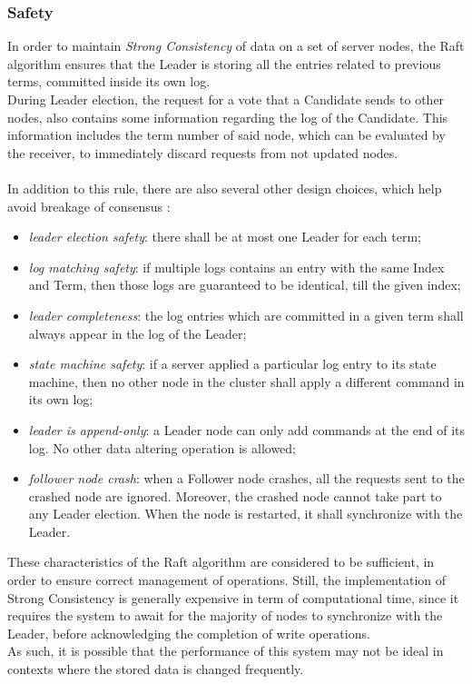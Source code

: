 \subsubsection{Safety}
In order to maintain \textit{Strong Consistency} of data on a set of server nodes, the Raft algorithm ensures that the Leader is storing all the entries related to previous terms, committed inside its own log. \\
During Leader election, the request for a vote that a Candidate sends to other nodes, also contains some information regarding the log of the Candidate. This information includes the term number of said node, which can be evaluated by the receiver, to immediately discard requests from not updated nodes. \\ \\
In addition to this rule, there are also several other design choices, which help avoid breakage of consensus \cite{site:raft-consensus-algorithm}:
\begin{itemize}
	\item \textit{leader election safety}: there shall be at most one Leader for each term;
	\item \textit{log matching safety}: if multiple logs contains an entry with the same Index and Term, then those logs are guaranteed to be identical, till the given index;
	\item \textit{leader completeness}: the log entries which are committed in a given term shall always appear in the log of the Leader;
	\item \textit{state machine safety}: if a server applied a particular log entry to its state machine, then no other node in the cluster shall apply a different command in its own log;
	\item \textit{leader is append-only}: a Leader node can only add commands at the end of its log. No other data altering operation is allowed;
	\item \textit{follower node crash}: when a Follower node crashes, all the requests sent to the crashed node are ignored. Moreover, the crashed node cannot take part to any Leader election. When the node is restarted, it shall synchronize with the Leader.
\end{itemize}
These characteristics of the Raft algorithm are considered to be sufficient, in order to ensure correct management of operations. Still, the implementation of Strong Consistency is generally expensive in term of computational time, since it requires the system to await for the majority of nodes to synchronize with the Leader, before acknowledging the completion of write operations. \\
As such, it is possible that the performance of this system may not be ideal in contexts where the stored data is changed frequently.

